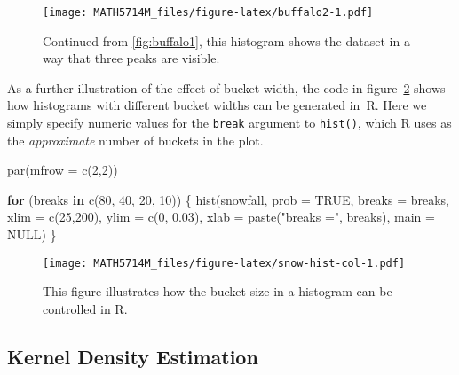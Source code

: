 \documentclass[
  a4paper,
]{article}
\newenvironment{Shaded}{\begin{snugshade}}{\end{snugshade}}
\newcommand{\AttributeTok}[1]{\textcolor[rgb]{0.77,0.63,0.00}{#1}}
\newcommand{\ConstantTok}[1]{\textcolor[rgb]{0.00,0.00,0.00}{#1}}
\newcommand{\ControlFlowTok}[1]{\textcolor[rgb]{0.13,0.29,0.53}{\textbf{#1}}}
\newcommand{\DecValTok}[1]{\textcolor[rgb]{0.00,0.00,0.81}{#1}}
\newcommand{\FloatTok}[1]{\textcolor[rgb]{0.00,0.00,0.81}{#1}}
\newcommand{\FunctionTok}[1]{\textcolor[rgb]{0.00,0.00,0.00}{#1}}
\newcommand{\NormalTok}[1]{#1}
\newcommand{\StringTok}[1]{\textcolor[rgb]{0.31,0.60,0.02}{#1}}
\theoremstyle{definition}
\theoremstyle{definition}
\theoremstyle{definition}
\theoremstyle{definition}
\theoremstyle{remark}
\begin{document}
\begin{figure}
\centering
\texttt{[image: MATH5714M\_files/figure-latex/buffalo2-1.pdf]}
\caption{\label{fig:buffalo2}Continued from \ref{fig:buffalo1}, this histogram shows the dataset in a way that three peaks are visible.}
\end{figure}

As a further illustration of the effect of bucket width, the code in
figure~\ref{fig:snow-hist-col} shows how histograms with different
bucket widths can be generated in~R. Here we simply specify numeric
values for the \texttt{break} argument to \texttt{hist()}, which R uses as the
\emph{approximate} number of buckets in the plot.



\begin{Shaded}
\begin{Highlighting}[]
\FunctionTok{par}\NormalTok{(}\AttributeTok{mfrow =} \FunctionTok{c}\NormalTok{(}\DecValTok{2}\NormalTok{,}\DecValTok{2}\NormalTok{))}

\ControlFlowTok{for}\NormalTok{ (breaks }\ControlFlowTok{in} \FunctionTok{c}\NormalTok{(}\DecValTok{80}\NormalTok{, }\DecValTok{40}\NormalTok{, }\DecValTok{20}\NormalTok{, }\DecValTok{10}\NormalTok{)) \{}
  \FunctionTok{hist}\NormalTok{(snowfall,}
       \AttributeTok{prob =} \ConstantTok{TRUE}\NormalTok{,}
       \AttributeTok{breaks =}\NormalTok{ breaks,}
       \AttributeTok{xlim =} \FunctionTok{c}\NormalTok{(}\DecValTok{25}\NormalTok{,}\DecValTok{200}\NormalTok{),}
       \AttributeTok{ylim =} \FunctionTok{c}\NormalTok{(}\DecValTok{0}\NormalTok{, }\FloatTok{0.03}\NormalTok{),}
       \AttributeTok{xlab =} \FunctionTok{paste}\NormalTok{(}\StringTok{"breaks ="}\NormalTok{, breaks),}
       \AttributeTok{main =} \ConstantTok{NULL}\NormalTok{)}
\NormalTok{\}}
\end{Highlighting}
\end{Shaded}

\begin{figure}
\centering
\texttt{[image: MATH5714M\_files/figure-latex/snow-hist-col-1.pdf]}
\caption{\label{fig:snow-hist-col}This figure illustrates how the bucket size in a histogram can be controlled in R.}
\end{figure}

\hypertarget{kernel-density-estimation}{%
\subsection{Kernel Density Estimation}\label{kernel-density-estimation}}
\end{document}
